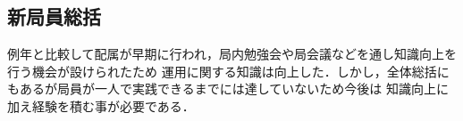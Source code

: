 \subsection*{新局員総括}

例年と比較して配属が早期に行われ，局内勉強会や局会議などを通し知識向上を行う機会が設けられたため
運用に関する知識は向上した．しかし，全体総括にもあるが局員が一人で実践できるまでには達していないため今後は
知識向上に加え経験を積む事が必要である．